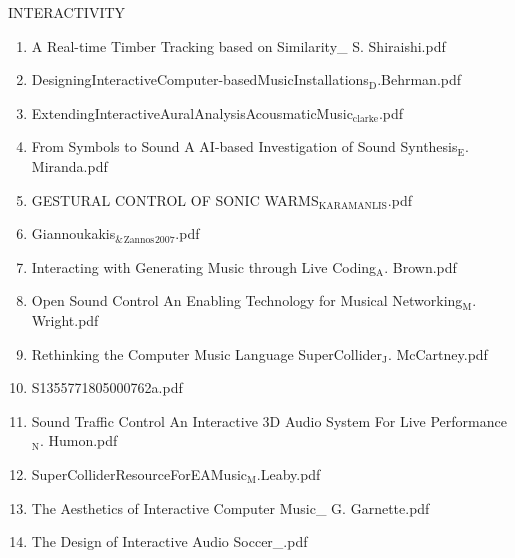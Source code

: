 \documentclass[11pt]{article}
\begin{document}
\item INTERACTIVITY
\label{sec-1-1-1-1-49-1-15}
\begin{enumerate}
\item A Real-time Timber Tracking based on Similarity\_ S. Shiraishi.pdf
\label{sec-1-1-1-1-49-1-15-1}

\item DesigningInteractiveComputer-basedMusicInstallations$_{\text{D}}$.Behrman.pdf
\label{sec-1-1-1-1-49-1-15-2}

\item ExtendingInteractiveAuralAnalysisAcousmaticMusic$_{\text{clarke}}$.pdf
\label{sec-1-1-1-1-49-1-15-3}

\item From Symbols to Sound A AI-based Investigation of Sound Synthesis$_{\text{E}}$. Miranda.pdf
\label{sec-1-1-1-1-49-1-15-4}

\item GESTURAL CONTROL OF SONIC WARMS$_{\text{KARAMANLIS}}$.pdf
\label{sec-1-1-1-1-49-1-15-5}

\item Giannoukakis$_{\text{\&}}$$_{\text{Zannos}}$$_{\text{2007}}$.pdf
\label{sec-1-1-1-1-49-1-15-6}

\item Interacting with Generating Music through Live Coding$_{\text{A}}$. Brown.pdf
\label{sec-1-1-1-1-49-1-15-7}

\item Open Sound Control An Enabling Technology for Musical Networking$_{\text{M}}$. Wright.pdf
\label{sec-1-1-1-1-49-1-15-8}

\item Rethinking the Computer Music Language SuperCollider$_{\text{J}}$. McCartney.pdf
\label{sec-1-1-1-1-49-1-15-9}

\item S1355771805000762a.pdf
\label{sec-1-1-1-1-49-1-15-10}

\item Sound Traffic Control An Interactive 3D Audio System For Live Performance$_{\text{N}}$. Humon.pdf
\label{sec-1-1-1-1-49-1-15-11}

\item SuperColliderResourceForEAMusic$_{\text{M}}$.Leaby.pdf
\label{sec-1-1-1-1-49-1-15-12}

\item The Aesthetics of Interactive Computer Music\_ G. Garnette.pdf
\label{sec-1-1-1-1-49-1-15-13}

\item The Design of Interactive Audio Soccer\_.pdf
\label{sec-1-1-1-1-49-1-15-14}


\end{enumerate}
\end{document}

